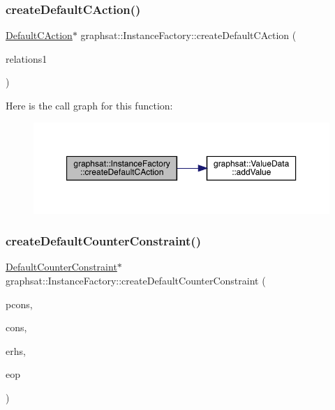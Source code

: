 \subsubsection{\texorpdfstring{createDefaultCAction()}{createDefaultCAction()}}
{\footnotesize\ttfamily \mbox{\hyperlink{classgraphsat_1_1_default_c_action}{Default\+C\+Action}}$\ast$ graphsat\+::\+Instance\+Factory\+::create\+Default\+C\+Action (\begin{DoxyParamCaption}\item[{vector$<$ pair$<$ int, vector$<$ pair$<$ int, int $>$$>$$>$$>$ \&}]{relations1 }\end{DoxyParamCaption})\hspace{0.3cm}{\ttfamily [inline]}}

Here is the call graph for this function\+:
\nopagebreak
\begin{figure}[H]
\begin{center}
\leavevmode
\includegraphics[width=350pt]{classgraphsat_1_1_instance_factory_aa74280c3c94e38d1b092925172181276_cgraph}
\end{center}
\end{figure}
\mbox{\label{classgraphsat_1_1_instance_factory_ac2eb9868107cc51e21a0e698d016267d}} 
\subsubsection{\texorpdfstring{createDefaultCounterConstraint()}{createDefaultCounterConstraint()}}
{\footnotesize\ttfamily \mbox{\hyperlink{classgraphsat_1_1_default_counter_constraint}{Default\+Counter\+Constraint}}$\ast$ graphsat\+::\+Instance\+Factory\+::create\+Default\+Counter\+Constraint (\begin{DoxyParamCaption}\item[{const vector$<$ int $>$ \&}]{pcons,  }\item[{const vector$<$ int $>$ \&}]{cons,  }\item[{int}]{erhs,  }\item[{\mbox{\hyperlink{namespacegraphsat_acfb5939f9bdafbd9aea0d084b9a56f69}{C\+O\+M\+P\+\_\+\+O\+P\+E\+R\+A\+T\+OR}}}]{eop }\end{DoxyParamCaption})\hspace{0.3cm}{\ttfamily [inline]}}

